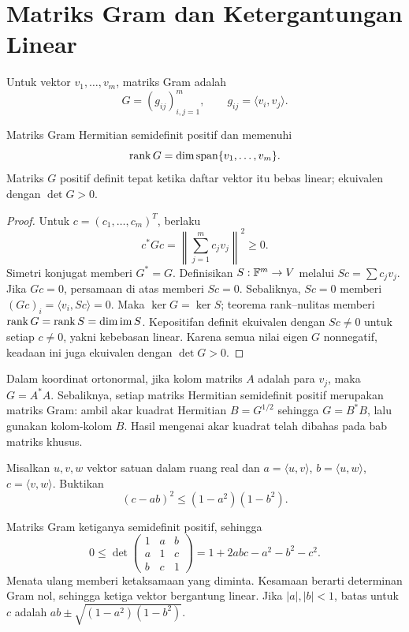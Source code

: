\section{Matriks Gram dan Ketergantungan Linear}

\begin{definisi}
    Untuk vektor $v_1,\ldots,v_m$, matriks Gram adalah
    \[
        G=(g_{ij})_{i,j=1}^m,\qquad g_{ij}=\langle v_i,v_j\rangle.
    \]
\end{definisi}

\begin{teorema}
    Matriks Gram Hermitian semidefinit positif dan memenuhi
    \[
        \operatorname{rank} G=\dim\operatorname{span}\{v_1,\ldots,v_m\}.
    \]
    Matriks $G$ positif definit tepat ketika daftar vektor itu
    bebas linear; ekuivalen dengan $\det G>0$.
\end{teorema}
\begin{proof}
    Untuk $c=(c_1,\ldots,c_m)^T$, berlaku
    \[
        c^*Gc=\left\|\sum_{j=1}^m c_jv_j\right\|^2\ge0.
    \]
    Simetri konjugat memberi $G^*=G$.
    Definisikan $S:\mathbb{F}^m\to V$ melalui $Sc=\sum c_jv_j$.
    Jika $Gc=0$, persamaan di atas memberi $Sc=0$.
    Sebaliknya, $Sc=0$ memberi $(Gc)_i=\langle v_i,Sc\rangle=0$.
    Maka $\ker G=\ker S$; teorema rank--nulitas memberi
    $\operatorname{rank} G=\operatorname{rank} S=\dim\operatorname{im}S$.
    Kepositifan definit ekuivalen dengan $Sc\ne0$ untuk setiap
    $c\ne0$, yakni kebebasan linear. Karena semua nilai eigen
    $G$ nonnegatif, keadaan ini juga ekuivalen dengan $\det G>0$.
\end{proof}

Dalam koordinat ortonormal, jika kolom matriks $A$ adalah para
$v_j$, maka $G=A^*A$. Sebaliknya, setiap matriks Hermitian
semidefinit positif merupakan matriks Gram: ambil akar kuadrat
Hermitian $B=G^{1/2}$ sehingga $G=B^*B$, lalu gunakan kolom-kolom $B$.
Hasil mengenai akar kuadrat telah dibahas pada bab matriks khusus.

\begin{exam}
    Misalkan $u,v,w$ vektor satuan dalam ruang real dan
    $a=\langle u,v\rangle$, $b=\langle u,w\rangle$,
    $c=\langle v,w\rangle$. Buktikan
    \[
        (c-ab)^2\le(1-a^2)(1-b^2).
    \]
\end{exam}
\begin{solution}
    Matriks Gram ketiganya semidefinit positif, sehingga
    \[
        0\le\det\begin{pmatrix}1&a&b\\a&1&c\\b&c&1\end{pmatrix}
          =1+2abc-a^2-b^2-c^2.
    \]
    Menata ulang memberi ketaksamaan yang diminta.
    Kesamaan berarti determinan Gram nol, sehingga ketiga
    vektor bergantung linear. Jika $|a|,|b|<1$, batas untuk $c$ adalah
    $ab\pm\sqrt{(1-a^2)(1-b^2)}$.
\end{solution}

